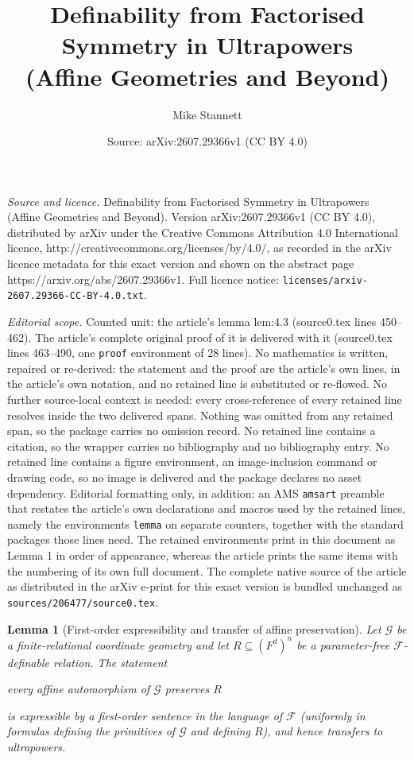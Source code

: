 \documentclass[10pt,a4paper]{amsart}
\title{Definability from Factorised Symmetry in Ultrapowers\\[2mm] \large (Affine Geometries and Beyond)}
\author{Mike Stannett}
\date{Source: arXiv:2607.29366v1 (CC BY 4.0)}
\newtheorem{lemma}{Lemma}
\newcommand{\F}{\mathcal{F}}
\newcommand{\G}{\mathcal{G}}
\begin{document}
\maketitle

\noindent\emph{Source and licence.} Definability from Factorised Symmetry in Ultrapowers\\[2mm] \large (Affine Geometries and Beyond). Version arXiv:2607.29366v1 (CC BY 4.0), distributed by arXiv under the Creative Commons Attribution 4.0 International licence, http://creativecommons.org/licenses/by/4.0/, as recorded in the arXiv licence metadata for this exact version and shown on the abstract page https://arxiv.org/abs/2607.29366v1. Full licence notice: \texttt{licenses/arxiv-2607.29366-CC-BY-4.0.txt}.\par\smallskip

\noindent\textit{Editorial scope.} Counted unit: the article's lemma lem:4.3 (source0.tex lines 450--462). The article's complete original proof of it is delivered with it (source0.tex lines 463--490, one \texttt{proof} environment of 28 lines). No mathematics is written, repaired or re-derived: the statement and the proof are the article's own lines, in the article's own notation, and no retained line is substituted or re-flowed.  No further source-local context is needed: every cross-reference of every retained line resolves inside the two delivered spans.  Nothing was omitted from any retained span, so the package carries no omission record.  No retained line contains a citation, so the wrapper carries no bibliography and no bibliography entry.  No retained line contains a figure environment, an image-inclusion command or drawing code, so no image is delivered and the package declares no asset dependency.  Editorial formatting only, in addition: an AMS \texttt{amsart} preamble that restates the article's own declarations and macros used by the retained lines, namely the environments \texttt{lemma} on separate counters, together with the standard packages those lines need.  The retained environments print in this document as Lemma 1 in order of appearance, whereas the article prints the same items with the numbering of its own full document.  The complete native source of the article as distributed in the arXiv e-print for this exact version is bundled unchanged as \texttt{sources/206477/source0.tex}.
\begin{lemma}[First-order expressibility and transfer of affine
preservation]
\label{lem:4.3}
Let $\G$ be a finite-relational coordinate geometry and
let $R\subseteq (F^d)^n$ be a parameter-free $\F$-definable
relation. The statement
\begin{center}
\emph{every affine automorphism of $\G$ preserves $R$}
\end{center}
is expressible by a first-order sentence in the language of
$\F$ (uniformly in formulas defining the primitives of $\G$
and defining $R$), and hence transfers to ultrapowers.
\end{lemma}
\end{document}
